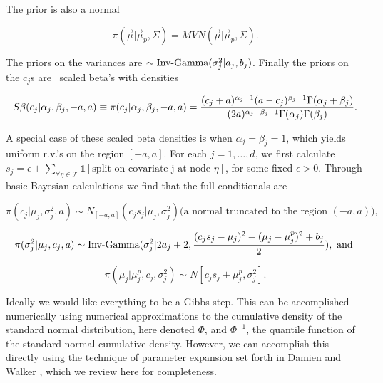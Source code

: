  The prior is also a normal 
 
 \begin{equation}
 \pi(\vec{\mu}\vert \vec{\mu}_p, \Sigma)=MVN(\vec{\mu}\vert \vec{\mu}_p, \Sigma).
 \end{equation}

The priors on the variances are \iid $\sim \text{Inv-Gamma}({\sigma_j^2}\vert{a_j},{b_j})$.
Finally the priors on the $c_j$s are \iid\ scaled beta's with densities 

\begin{equation}\newnot{symbol:scaled_beta}
S\beta(c_j\vert \alpha_j, \beta_j, -a, a)\equiv\pi(c_j\vert \alpha_j, \beta_j, -a, a)= \frac{(c_j+a)^{\alpha_j-1}(a-c_j)^{\beta_j-1}\Gamma(\alpha_j+\beta_j)}{(2a)^{\alpha_j+\beta_j-1}\Gamma(\alpha_j)\Gamma(\beta_j)}.
\end{equation}

A special case of these scaled beta densities is when $\alpha_j=\beta_j=1$, which yields uniform r.v.'s on the region  $[-a,a]$. 
For each $j=1, \dots, d$, we first calculate $s_j = \epsilon+\sum_{\forall \eta \in \mathcal{T}}\mathds{1}[\text{split on covariate j at node $\eta$}]$, for some fixed $\epsilon>0$.
Through basic Bayesian calculations we find that the full conditionals are 

\begin{equation}
\pi(c_j\vert \mu_j, \sigma_j^2, a) \sim N_{[-a,a]}(c_js_j\vert \mu_j, \sigma^2_j) \text{(a normal truncated to the region $(-a,a)$),}
\end{equation}

\begin{equation}
\pi(\sigma^2_j \vert \mu_j, c_j, a) \sim \text{Inv-Gamma}({\sigma_j^2}\vert{2a_j+2},{\frac{(c_js_j-\mu_j)^2+ (\mu_j-\mu_j^p)^2+b_j}{2}}), \text{ and } 
\end{equation}

\begin{equation}
\pi(\mu_j\vert \mu_j^p, c_j, \sigma^2_j)\sim N[c_js_j+\mu_j^p, \sigma_j^2].
\end{equation}

Ideally we would like everything to be a Gibbs step. This can be accomplished numerically using numerical approximations to the cumulative density of the standard normal distribution, here denoted $\Phi$, and $\Phi^{-1}$, the quantile function of the standard normal cumulative density.  However, we can accomplish this directly using the technique of parameter expansion set forth in Damien and Walker \cite{damien2001sampling}, which we review here for completeness. 
 
